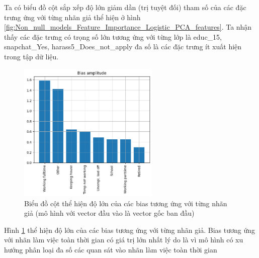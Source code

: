 \begin{enumerate}[label=(\alph*)]
    Ta có biểu đồ cột sắp xếp độ lớn giảm dần (trị tuyệt đối) tham số của các đặc trưng ứng với từng nhãn giả thể hiện ở hình \ref{fig:Non_null_models_Feature_Importance_Logistic_PCA_features}.
    Ta nhận thấy các đặc trưng có trọng số lớn tương ứng với từng lớp là educ\_15, snapchat\_Yes, harass5\_Does\_not\_apply đa số là các đặc trưng ít xuất hiện trong tập dữ liệu.

    \begin{figure}[H]
        \centering
        \includegraphics[width=0.6\textwidth]{figures/Thanh/Models/Logistic/Non_null_models_Bias_Importance_Logistic_original_features.png}
        \caption{Biểu đồ cột thể hiện độ lớn của các bias tương ứng với từng nhãn giả (mô hình với vector đầu vào là vector gốc ban đầu)}
        \label{fig:Non_null_models_Bias_Importance_Logistic_original_features.png}
    \end{figure}

    Hình \ref{fig:Non_null_models_Bias_Importance_Logistic_original_features.png} thể hiện độ lớn của các bias tương ứng với từng nhãn giả.
    Bias tương ứng với nhãn làm việc toàn thời gian có giá trị lớn nhất lý do là vì mô hình có xu hướng phân loại đa số các quan sát vào nhãn làm việc toàn thời gian
\end{enumerate}